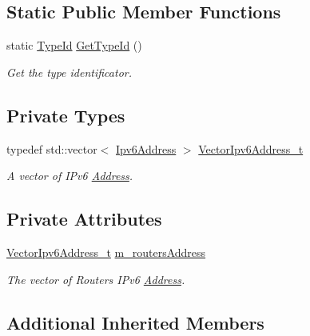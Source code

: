 \subsection*{Static Public Member Functions}
\begin{DoxyCompactItemize}
\item 
static \hyperlink{classns3_1_1TypeId}{Type\+Id} \hyperlink{classns3_1_1Ipv6ExtensionLooseRoutingHeader_a4a37db81dbe8e338f26571842a7b44f9}{Get\+Type\+Id} ()
\begin{DoxyCompactList}\small\item\em Get the type identificator. \end{DoxyCompactList}\end{DoxyCompactItemize}
\subsection*{Private Types}
\begin{DoxyCompactItemize}
\item 
typedef std\+::vector$<$ \hyperlink{classns3_1_1Ipv6Address}{Ipv6\+Address} $>$ \hyperlink{classns3_1_1Ipv6ExtensionLooseRoutingHeader_a75ec8e812e6671812068924297c93ebe}{Vector\+Ipv6\+Address\+\_\+t}
\begin{DoxyCompactList}\small\item\em A vector of I\+Pv6 \hyperlink{classns3_1_1Address}{Address}. \end{DoxyCompactList}\end{DoxyCompactItemize}
\subsection*{Private Attributes}
\begin{DoxyCompactItemize}
\item 
\hyperlink{classns3_1_1Ipv6ExtensionLooseRoutingHeader_a75ec8e812e6671812068924297c93ebe}{Vector\+Ipv6\+Address\+\_\+t} \hyperlink{classns3_1_1Ipv6ExtensionLooseRoutingHeader_a9bf9a391edb4d0e136ec2b46e3209e96}{m\+\_\+routers\+Address}
\begin{DoxyCompactList}\small\item\em The vector of Routers\textquotesingle{} I\+Pv6 \hyperlink{classns3_1_1Address}{Address}. \end{DoxyCompactList}\end{DoxyCompactItemize}
\subsection*{Additional Inherited Members}


